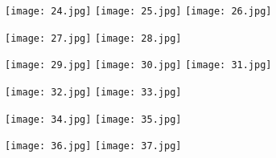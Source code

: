 \begin{figure}[!htbp]
%
\centering
\texttt{[image: 24.jpg]}
\subcaption{}
\endminipage\hfill
{}%
\centering
\texttt{[image: 25.jpg]}
\endminipage\hfill
{}%
\centering
\texttt{[image: 26.jpg]}
\endminipage\hfill
\caption{}
\end{figure}

\begin{figure}[!htbp]
%
\centering
\texttt{[image: 27.jpg]}
\subcaption{}
\endminipage\hfill
{}%
\centering
\texttt{[image: 28.jpg]}
\endminipage\hfill
\caption{}
\end{figure}


\begin{figure}[!htbp]
%
\centering
\texttt{[image: 29.jpg]}
\subcaption{}
\endminipage\hfill
{}%
\centering
\texttt{[image: 30.jpg]}
\endminipage\hfill
{}%
\centering
\texttt{[image: 31.jpg]}
\endminipage\hfill
\caption{}
\end{figure}

\begin{figure}[!htbp]
%
\centering
\texttt{[image: 32.jpg]}
\subcaption{}
\endminipage\hfill
{}%
\centering
\texttt{[image: 33.jpg]}
\endminipage\hfill
\caption{}
\end{figure}





\begin{figure}[!htbp]
%
\centering
\texttt{[image: 34.jpg]}
\subcaption{}
\endminipage\hfill
{}%
\centering
\texttt{[image: 35.jpg]}
\endminipage\hfill
\caption{}
\end{figure}


\begin{figure}[!htbp]
%
\centering
\texttt{[image: 36.jpg]}
\subcaption{}
\endminipage\hfill
{}%
\centering
\texttt{[image: 37.jpg]}
\endminipage\hfill
\caption{}
\end{figure}



